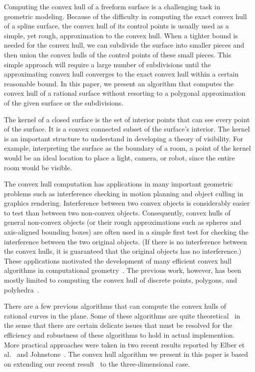 \documentclass[doublespacing]{elsart}
\begin{document}
Computing the convex hull of a freeform surface
is a challenging task in geometric modeling.
Because of the difficulty in computing the exact convex hull
of a spline surface, the convex hull of its control points is usually
used as a simple, yet rough, approximation to the convex hull.
When a tighter bound is needed for the convex hull, we can subdivide
the surface into smaller pieces and then union the convex hulls of
the control points of these small pieces. 
This simple approach will require a large number of subdivisions 
until the approximating convex hull converges to the exact convex hull
within a certain reasonable bound.  In this paper, we present
an algorithm that computes the convex hull of a rational surface
without resorting to a polygonal approximation of the given surface
or the subdivisions.

The kernel of a closed surface is the set of interior points
that can see every point of the surface.
It is a convex connected subset of the surface's interior.
The kernel is an important structure to understand in developing a theory of visibility.
For example, interpreting the surface as the boundary of a room,
a point of the kernel would be an ideal location to place a light, camera, or robot,
since the entire room would be visible.

The convex hull computation has applications in many important
geometric problems such as interference checking in motion planning
and object culling in graphics rendering.  Interference between two convex
objects is considerably easier to test than between two non-convex objects.
Consequently, convex hulls of general non-convex objects (or their rough
approximations such as spheres and axis-aligned bounding boxes) are often used
in a simple first test for checking the interference between the two
original objects.   (If there is no interference between the convex hulls,
it is guaranteed that the original objects has no interference.)
These applications motivated the development of many efficient
convex hull algorithms in computational geometry~\cite{Prep85}.
The previous work, however, has been mostly limited to computing
the convex hull of discrete points, polygons, and
polyhedra~\cite{Graham83,Lee83,Prep85}.

There are a few previous algorithms that can compute the convex hulls
of rational curves in the plane.  Some of these algorithms are quite
theoretical~\cite{Kim91,Souvaine90,Schaeffer87} in the sense that
there are certain delicate issues that must be resolved for the efficiency
and robustness of these algorithms to hold in actual implemention.
More practical approaches were taken in two recent results reported
by Elber et al.~\cite{Elber2001b} and Johnstone~\cite{Johnstone2001}.
The convex hull algorithm we present in this paper is based on
extending our recent result~\cite{Elber2001b} to the three-dimensional case.
\end{document}
